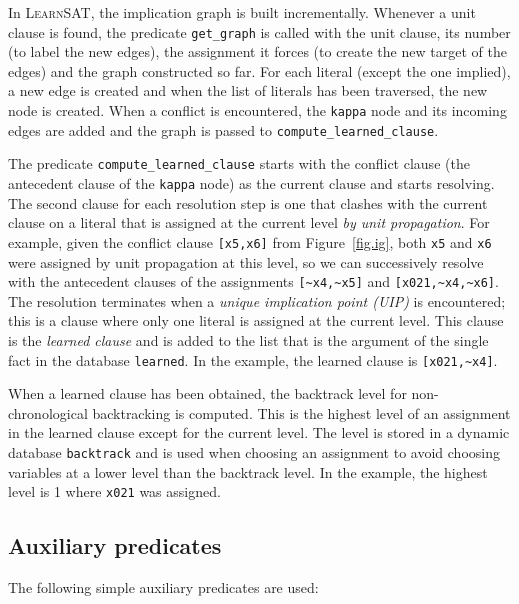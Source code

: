 \documentclass[11pt]{article}
\newcommand*{\p}[1]{\textup{\texttt{#1}}}
\newcommand*{\ls}{\textsc{LearnSAT}}
\begin{document}
In \ls{}, the implication graph is built incrementally. Whenever a unit
clause is found, the predicate \p{get\_graph} is called with the unit
clause, its number (to label the new edges), the assignment it forces
(to create the new target of the edges) and the graph constructed so
far. For each literal (except the one implied), a new edge is created
and when the list of literals has been traversed, the new node is
created. When a conflict is encountered, the \p{kappa} node and its
incoming edges are added and the graph is passed to
\p{compute\_learned\_clause}.

The predicate \p{compute\_learned\_clause} starts with the conflict
clause (the antecedent clause of the \p{kappa} node) as the current
clause and starts resolving. The second clause for each resolution step
is one that clashes with the current clause on a literal that is
assigned at the current level \emph{by unit propagation}. For example,
given the conflict clause \p{[x5,x6]} from Figure~\ref{fig.ig}, both
\p{x5} and \p{x6} were assigned by unit propagation at this level, so we
can successively resolve with the antecedent clauses of the assignments
\verb+[~x4,~x5]+ and \verb+[x021,~x4,~x6]+. The resolution terminates
when a \emph{unique implication point (UIP)} is encountered; this is a
clause where only one literal is assigned at the current level. This
clause is the \emph{learned clause} and is added to the list that is the
argument of the single fact in the database \p{learned}. In the example,
the learned clause is \verb+[x021,~x4]+.

When a learned clause has been obtained, the backtrack level for
non-chronological backtracking is computed. This is the highest level of
an assignment in the learned clause except for the current level. The
level is stored in a dynamic database \p{backtrack} and is used when
choosing an assignment to avoid choosing variables at a lower level than
the backtrack level. In the example, the highest level is 1 where
\p{x021} was assigned.


\subsection{Auxiliary predicates}

The following simple auxiliary predicates are used:
\end{document}
